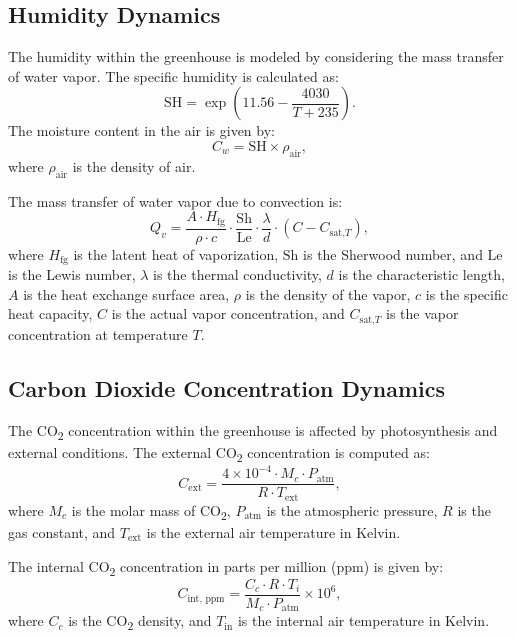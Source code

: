 \documentclass[conference]{IEEEtran}
\begin{document}
\subsection{Humidity Dynamics}\label{subsec:humidity}

The humidity within the greenhouse is modeled by considering the mass transfer of water vapor. The specific humidity is calculated as:
\begin{equation}
    \text{SH} = \exp\left(11.56 - \frac{4030}{T + 235}\right).
\end{equation}
The moisture content in the air is given by:
\begin{equation}
    C_w = \text{SH} \times \rho_{\text{air}},
\end{equation}
where \(\rho_{\text{air}}\) is the density of air.

The mass transfer of water vapor due to convection is:
\begin{equation}
    Q_{v} = \frac{A \cdot H_{\text{fg}}}{\rho \cdot c} \cdot \frac{\text{Sh}}{\text{Le}} \cdot \frac{\lambda}{d} \cdot \left( C - C_{\text{sat,}T} \right),
\end{equation}
where \(H_{\text{fg}}\) is the latent heat of vaporization, \(\text{Sh}\) is the Sherwood number, and \(\text{Le}\) is the Lewis number, \(\lambda \) is the thermal conductivity, \(d\) is the characteristic length, \(A\) is the heat exchange surface area, \(\rho \) is the density of the vapor, \(c\) is the specific heat capacity, \(C\) is the actual vapor concentration, and \(C_{\text{sat,}T}\) is the vapor concentration at temperature \(T\).

\subsection{Carbon Dioxide Concentration Dynamics}

The CO\textsubscript{2} concentration within the greenhouse is affected by photosynthesis and external conditions. The external CO\textsubscript{2} concentration is computed as:
\begin{equation}
    C_{\text{ext}} = \frac{4 \times 10^{-4} \cdot M_c \cdot P_{\text{atm}}}{R \cdot T_{\text{ext}}},
\end{equation}
where \(M_c\) is the molar mass of CO\textsubscript{2}, \(P_{\text{atm}}\) is the atmospheric pressure, \(R\) is the gas constant, and \(T_{\text{ext}}\) is the external air temperature in Kelvin.

The internal CO\textsubscript{2} concentration in parts per million (ppm) is given by:
\begin{equation}
    C_{\text{int, ppm}} = \frac{C_c \cdot R \cdot T_i}{M_c \cdot P_{\text{atm}}} \times 10^6,
\end{equation}
where \(C_c\) is the CO\textsubscript{2} density, and \(T_{\text{in}}\) is the internal air temperature in Kelvin.
\end{document}

